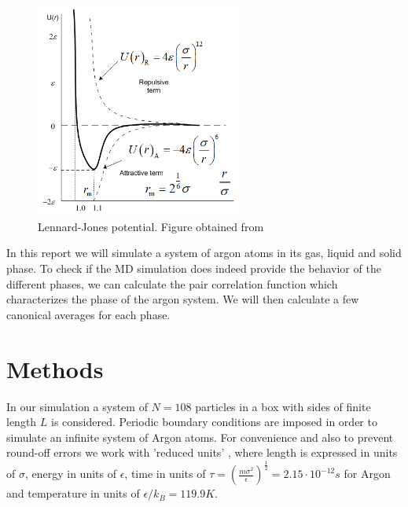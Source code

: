 \documentclass[11pt]{article}
\begin{document}
\begin{figure}[h!]
\centering
\includegraphics[width=0.6\textwidth]{lennard_jones}
\caption{Lennard-Jones potential. Figure obtained from \cite{lennard-jones}}\label{lj}
\end{figure}

In this report we will simulate a system of argon atoms in its gas, liquid and solid phase. To check if the MD simulation does indeed provide the behavior of the different phases, we can calculate the pair correlation function which characterizes the phase of the argon system. We will then calculate a few canonical averages for each phase.


\section{Methods}
In our simulation a system of $N=108$ particles in a box with sides of finite length $L$ is considered.  Periodic boundary conditions are imposed in order to simulate an infinite system of Argon atoms. For convenience and also to prevent round-off errors we work with 'reduced units' , where length is expressed in units of $\sigma$, energy in units of $\epsilon$, time in units of $\tau=(\frac{m\sigma^2}{\epsilon})^\frac{1}{2}=2.15\cdot10^{-12} s$ for Argon and temperature in units of $\epsilon/k_B=119.9 K$. 
\end{document}
